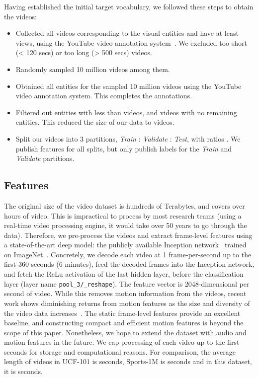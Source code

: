 \documentclass{sig-alternate-05-2015}
\begin{document}
Having established the initial target vocabulary, we followed these steps to obtain
the videos:

\begin{itemize}
  \setlength\itemsep{0em}
  \item Collected all videos corresponding to the  visual entities and have at least  views, using the YouTube video annotation system~\cite{youtube-legos}. We excluded too short (< 120 secs) or too long (> 500 secs) videos. \item Randomly sampled 10 million videos among them.
  \item Obtained all entities for the sampled 10 million videos using the YouTube video annotation system. This completes the annotations.
  \item Filtered out entities with less than  videos, and videos with no remaining entities. This reduced the size of our data to  videos. \item Split our videos into 3 partitions, {\it Train} : {\it Validate} : {\it Test}, with ratios . We publish features for all splits, but only publish labels for the {\it Train} and {\it Validate} partitions.
\end{itemize}

\subsection{Features}
\label{sec:features}

The original size of the video dataset is hundreds of Terabytes, and covers over  hours of video.
This is impractical to process by most research teams (using a real-time video
processing engine, it would take over 50 years to go through the data). Therefore, we
pre-process the videos and extract frame-level features using a state-of-the-art deep model:
the publicly available Inception network~\cite{tensorflowimage} trained on ImageNet~\cite{inception-bn}.
Concretely, we decode each video at 1 frame-per-second up to the first 360 seconds
(6 minutes), feed the decoded frames into the Inception network, and
fetch the ReLu activation of the last hidden layer, before the classification layer (layer name
\texttt{pool\_3/\_reshape}). The feature vector is 2048-dimensional per second of video. While this removes motion
information from the videos, recent work shows diminishing returns from motion
features as the size and diversity of the video data increases~\cite{beyond,c3d}. The static
frame-level features provide an excellent baseline, and constructing compact and
efficient motion features is beyond the scope of this paper. Nonetheless, we hope to
extend the dataset with audio and motion features in the future.
We cap processing of each video up to the first
 seconds for storage and computational reasons. For comparison, the average length of videos in UCF-101 is
 seconds, Sports-1M is  seconds and in this dataset, it is  seconds.
\end{document}
